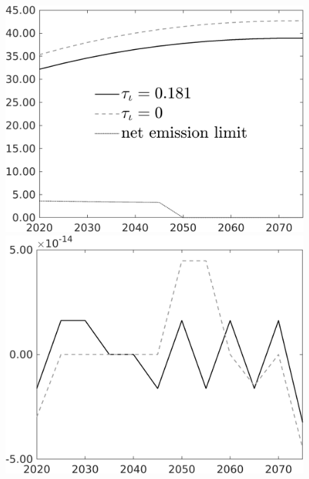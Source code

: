 \documentclass[12pt]{article}
\begin{document}
\begin{figure}[h!!]
\begin{minipage}[]{0.32\textwidth}
		\includegraphics[width=1\textwidth]{../../codding_model/own_basedOnFried/optimalPol_010922_revision/figures/all_13Sept22/CompTauf_bytaul_Reg0_Emnet_spillover0_nsk1_xgr1_knspil1_sep1_LFlimit0_emsbase0_countec0_GovRev0_etaa0.79_lgd1.png}
	\end{minipage}	
	\begin{minipage}[]{0.32\textwidth}
		\includegraphics[width=1\textwidth]{../../codding_model/own_basedOnFried/optimalPol_010922_revision/figures/all_13Sept22/PerdifNoTauf_regime0_CompTaul_hh_spillover0_nsk1_xgr1_knspil1_sep1_LFlimit0_emsbase0_countec0_GovRev0_etaa0.79_lgd0.png}

\end{minipage}
\end{figure}
\end{document}

